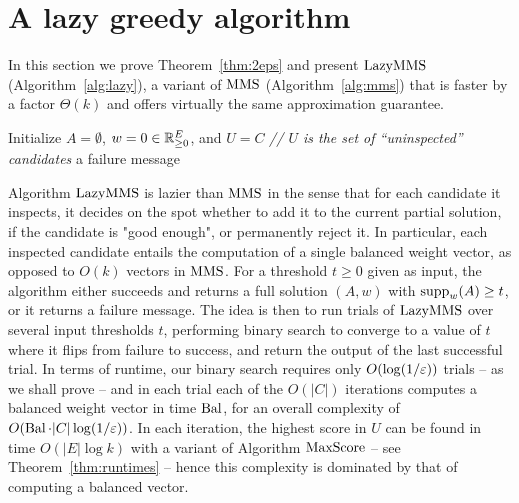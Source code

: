 \section{A lazy greedy algorithm}\label{s:lazymms}

In this section we prove Theorem~\ref{thm:2eps} and present $\lazy$ (Algorithm~\ref{alg:lazy}), a variant of $\operatorname{MMS}$ (Algorithm~\ref{alg:mms}) that is faster by a factor $\Theta(k)$ and offers virtually the same approximation guarantee.

\begin{algorithm}[htb]\label{alg:lazy}
\SetAlgoLined
{}
Initialize $A=\emptyset$, $w=0\in\mathbb{R}_{\geq 0}^E$, and $U=C$ \quad \emph{// $U$ is the set of ``uninspected'' candidates} \;
\Return a failure message\;
\caption{$\lazy$}
\end{algorithm}

Algorithm $\lazy$ is lazier than $\operatorname{MMS}$ in the sense that for each candidate it inspects, it decides on the spot whether to add it to the current partial solution, if the candidate is "good enough", or permanently reject it. In particular, each inspected candidate entails the computation of a single balanced weight vector, as opposed to $O(k)$ vectors in $\operatorname{MMS}$. 
For a threshold $t\geq 0$ given as input, the algorithm either succeeds and returns a full solution $(A,w)$ with $\operatorname{supp}_w(A)\geq t$, or it returns a failure message. 
The idea is then to run trials of $\lazy$ over several input thresholds $t$, performing binary search to converge to a value of $t$ where it flips from failure to success, and return the output of the last successful trial. 
In terms of runtime, our binary search requires only $O(\log (1/\varepsilon))$ trials -- as we shall prove -- and in each trial each of the $O(|C|)$ iterations computes a balanced weight vector in time $\operatorname{Bal}$, for an overall complexity of $O(\operatorname{Bal}\cdot |C| \log (1/\varepsilon))$. 
In each iteration, the highest score in $U$ can be found in time $O(|E|\log k)$ with a variant of Algorithm $\operatorname{MaxScore}$ -- see Theorem~\ref{thm:runtimes} -- hence this complexity is dominated by that of computing a balanced vector.  

